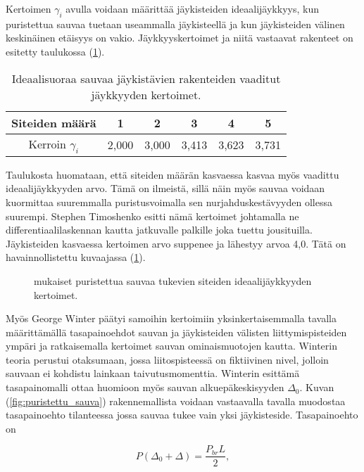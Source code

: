 \documentclass[12pt]{article}
\newenvironment{content}{\pagenumbering{arabic}}{}
\begin{document}
\begin{content}
Kertoimen $\gamma_i$ avulla voidaan määrittää jäykisteiden ideaalijäykkyys, kun puristettua sauvaa tuetaan useammalla jäykisteellä ja kun jäykisteiden välinen keskinäinen etäisyys on vakio. Jäykkyyskertoimet ja niitä vastaavat rakenteet on esitetty taulukossa (\ref{tab:ideaalijäykkyydet}).

\begin{table}[htb]
\centering
\caption{Ideaalisuoraa sauvaa jäykistävien rakenteiden vaaditut jäykkyyden kertoimet.}
\begin{tabular}{c c c c c c}
\label{tab:ideaalijäykkyydet}

Siteiden määrä & 1 & 2 & 3 & 4 & 5   \\
\hline
Kerroin $\gamma_i$ & 2,000 &3,000 & 3,413 & 3,623 & 3,731 
\end{tabular}
\end{table}

Taulukosta huomataan, että siteiden määrän kasvaessa kasvaa myös vaadittu ideaalijäykkyyden arvo. Tämä on ilmeistä, sillä näin myös sauvaa voidaan kuormittaa suuremmalla puristusvoimalla sen nurjahduskestävyyden ollessa suurempi. Stephen Timoshenko esitti nämä kertoimet \parencite{timoshenko} johtamalla ne differentiaalilaskennan kautta jatkuvalle palkille joka tuettu jousituilla. Jäykisteiden kasvaessa kertoimen arvo suppenee ja lähestyy arvoa 4,0. Tätä on havainnollistettu kuvaajassa (\ref{fig:jäykkyyskertoimet}).

\begin{figure}[htb]

\caption{\parencite{timoshenko} mukaiset puristettua sauvaa tukevien siteiden ideaalijäykkyyden kertoimet. }
\label{fig:jäykkyyskertoimet}
\end{figure}

Myös George Winter päätyi samoihin kertoimiin \parencite{winter} yksinkertaisemmalla tavalla määrittämällä tasapainoehdot sauvan ja jäykisteiden välisten liittymispisteiden ympäri ja ratkaisemalla kertoimet sauvan ominaismuotojen kautta. Winterin teoria perustui otaksumaan, jossa liitospisteessä on fiktiivinen nivel, jolloin sauvaan ei kohdistu lainkaan taivutusmomenttia. Winterin esittämä tasapainomalli ottaa huomioon myös sauvan alkuepäkeskisyyden $\Delta_0$. Kuvan (\ref{fig:puristettu_sauva}) rakennemallista voidaan vastaavalla tavalla muodostaa tasapainoehto tilanteessa jossa sauvaa tukee vain yksi jäykisteside. Tasapainoehto on

\begin{equation}
\label{tasapainoehto}
P (\Delta_0 + \Delta) = \frac{P_{br} L}{2},
\end{equation}


\end{content}
\end{document}
